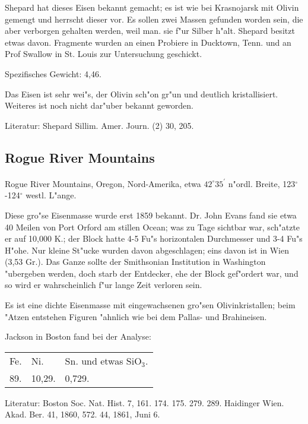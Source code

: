 \documentclass[a4paper, 11pt, oneside]{article}
\begin{document}
Shepard hat dieses Eisen bekannt gemacht; es ist wie bei Krasnojarsk mit Olivin gemengt und herrscht dieser vor. Es sollen zwei Massen gefunden worden sein, die aber verborgen gehalten werden, weil man. sie f"ur Silber h"alt. Shepard besitzt etwas davon. Fragmente wurden an einen Probiere in Ducktown, Tenn. und an Prof Swallow in St. Louis zur Untersuchung geschickt.

Spezifisches Gewicht: 4,46.

Das Eisen ist sehr wei"s, der Olivin sch"on gr"un und deutlich kristallisiert. Weiteres ist noch nicht dar"uber bekannt geworden.

\footnotesize
Literatur: Shepard Sillim. Amer. Journ. (2) 30, 205.

\subsection{Rogue River Mountains}
\normalsize
\paragraph{}
Rogue River Mountains, Oregon, Nord-Amerika, etwa $42^\circ 35^\prime$ n"ordl. Breite, 123$^\circ$-124$^\circ$ westl. L"ange.

Diese gro"se Eisenmasse wurde erst 1859 bekannt. Dr. John Evans fand sie etwa 40 Meilen von Port Orford am stillen Ocean; was zu Tage sichtbar war, sch"atzte er auf 10,000 K.; der Block hatte 4-5 Fu"s horizontalen Durchmesser und 3-4 Fu"s H"ohe. Nur kleine St"ucke wurden davon abgeschlagen; eins davon ist in Wien (3,53 Gr.). Das Ganze sollte der Smithsonian Institution in Washington "ubergeben werden, doch starb der Entdecker, ehe der Block gef"ordert war, und so wird er wahrscheinlich f"ur lange Zeit verloren sein.

Es ist eine dichte Eisenmasse mit eingewachsenen gro"sen Olivinkristallen; beim "Atzen entstehen Figuren "ahnlich wie bei dem Pallas- und Brahineisen.

Jackson in Boston fand bei der Analyse:
\begin{table}[H]
    \centering
    \begin{tabular}{l l l}
        Fe. & Ni. & Sn. und etwas SiO$_{3}$.  \\
        89. & 10,29. & 0,729. \\
    \end{tabular}
\end{table}

\footnotesize
Literatur: Boston Soc. Nat. Hist. 7, 161. 174. 175. 279. 289. Haidinger Wien. Akad. Ber. 41, 1860, 572. 44, 1861, Juni 6.
\end{document}
